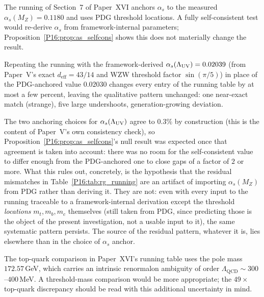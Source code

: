 \begin{remark}
\label{P16:rem:external_inputs}
The running of Section~7 of Paper~XVI anchors $\alpha_s$ to the
measured $\alpha_s(M_Z)=0.1180$ and uses PDG threshold locations.
A fully self-consistent test would re-derive $\alpha_s$ from
framework-internal parameters; Proposition~\ref{P16:prop:as_selfcons} shows
this does not materially change the result.
\end{remark}

\begin{proposition}
\label{P16:prop:as_selfcons}
Repeating the running with the framework-derived
$\alpha_s(\Lambda_{\mathrm{UV}})=0.02039$ (from Paper~V's exact $d_{\mathrm{eff}}=43/14$
and WZW threshold factor $\sin(\pi/5)$) in place of the PDG-anchored
value $0.02030$ changes every entry of the running table by at most a
few percent, leaving the qualitative pattern unchanged: one near-exact
match (strange), five large undershoots, generation-growing deviation.
\end{proposition}

\begin{remark}
\label{P16:rem:as_selfcons_informative}
The two anchoring choices for $\alpha_s(\Lambda_{\mathrm{UV}})$ agree to $0.3\%$ by
construction (this is the content of Paper~V's own consistency check),
so Proposition~\ref{P16:prop:as_selfcons}'s null result was expected once
that agreement is taken into account: there was no room for the
self-consistent value to differ enough from the PDG-anchored one to
close gaps of a factor of $2$ or more. What this rules out, concretely,
is the hypothesis that the residual mismatches in
Table~\ref{P16:tab:rg_running} are an artifact of importing $\alpha_s(M_Z)$
from PDG rather than deriving it. They are not: even with every input
to the running traceable to a framework-internal derivation except the
threshold \emph{locations} $m_t,m_b,m_c$ themselves (still taken from
PDG, since predicting those is the object of the present
investigation, not a usable input to it), the same systematic pattern
persists. The source of the residual pattern, whatever it is, lies
elsewhere than in the choice of $\alpha_s$ anchor.
\end{remark}

\begin{remark}
\label{P16:rem:pole_mass_caveat}
The top-quark comparison in Paper~XVI's running table uses the pole mass
$172.57$\,GeV, which carries an intrinsic renormalon ambiguity of order
$\Lambda_{\mathrm{QCD}}\sim300$--$400$\,MeV. A threshold-mass comparison
would be more appropriate; the $49\times$ top-quark discrepancy should
be read with this additional uncertainty in mind.
\end{remark}

